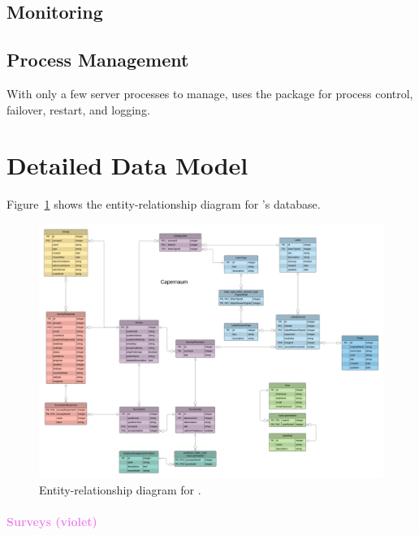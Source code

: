 \documentclass{article}
\begin{document}
\subsection{Monitoring}
\label{sec:monitoring}


\subsection{Process Management}
\label{sec:process-management}

With only a few server processes to manage,
\caper{} uses the \pmtwo
package for process control,
failover,
restart,
and logging.


\appendix

\section{Detailed Data Model}
\label{sec:detailed-data-model}

Figure~\ref{fig:erd} shows the entity-relationship diagram for \caper's \pg{} database.
\begin{figure}
  \centering
  \includegraphics[width=\textwidth]{data-model}
  \caption{Entity-relationship diagram for \caper.}
  \label{fig:erd}
\end{figure}

\paragraph{\textcolor{Violet}{Surveys (violet)}}
\end{document}
